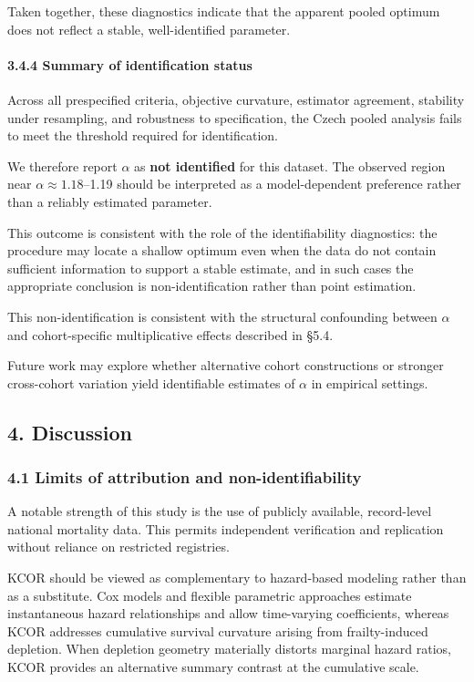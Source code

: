 \documentclass[
]{article}
\begin{document}
Taken together, these diagnostics indicate that the apparent pooled
optimum does not reflect a stable, well-identified parameter.

\paragraph{3.4.4 Summary of identification
status}\label{summary-of-identification-status}

Across all prespecified criteria, objective curvature, estimator
agreement, stability under resampling, and robustness to specification,
the Czech pooled analysis fails to meet the threshold required for
identification.

We therefore report \(\alpha\) as \textbf{not identified} for this
dataset. The observed region near \(\alpha \approx 1.18\)--1.19 should
be interpreted as a model-dependent preference rather than a reliably
estimated parameter.

This outcome is consistent with the role of the identifiability
diagnostics: the procedure may locate a shallow optimum even when the
data do not contain sufficient information to support a stable estimate,
and in such cases the appropriate conclusion is non-identification
rather than point estimation.

This non-identification is consistent with the structural confounding
between \(\alpha\) and cohort-specific multiplicative effects described
in §5.4.

Future work may explore whether alternative cohort constructions or
stronger cross-cohort variation yield identifiable estimates of
\(\alpha\) in empirical settings.

\subsection{4. Discussion}\label{discussion}

\subsubsection{4.1 Limits of attribution and
non-identifiability}\label{limits-of-attribution-and-non-identifiability}

A notable strength of this study is the use of publicly available,
record-level national mortality data. This permits independent
verification and replication without reliance on restricted registries.

KCOR should be viewed as complementary to hazard-based modeling rather
than as a substitute. Cox models and flexible parametric approaches
estimate instantaneous hazard relationships and allow time-varying
coefficients, whereas KCOR addresses cumulative survival curvature
arising from frailty-induced depletion. When depletion geometry
materially distorts marginal hazard ratios, KCOR provides an alternative
summary contrast at the cumulative scale.
\end{document}
